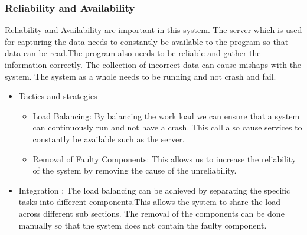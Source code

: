 \subsubsection{Reliability and Availability}	
\begin{flushleft}
Reliability and Availability are important in this system. The server which is used for capturing the data needs to constantly be available to the program so that data can be read.The program also needs to be reliable and gather the information correctly. The collection of incorrect data can cause mishaps with the system. The system as a whole needs to be running and not crash and fail.
\begin{itemize}
\item{Tactics and strategies}
\begin{itemize}
\item{Load Balancing}: By balancing the work load we can ensure that a system can continuously run and not have a crash. This call also cause services to constantly be available such as the server.
\item{Removal of Faulty Components}: This allows us to increase the reliability of the system by removing the cause of the unreliability.
\end{itemize}

\item{Integration} :
The load balancing can be achieved by separating the specific tasks into different components.This allows the system to share the load across different sub sections. The removal of the components can be done manually so that the system does not contain the faulty component.
\end{itemize}

\end{flushleft}	
		\iffalse
